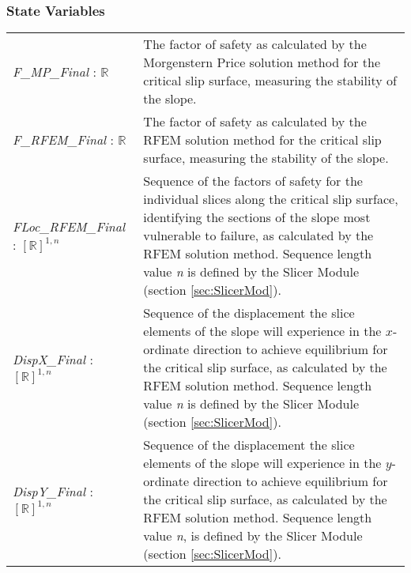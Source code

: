 \documentclass[12pt, titlepage]{article}
\begin{document}
\subsubsection{State Variables}
\renewcommand{\arraystretch}{1.5}
\begin{longtable}{p{} p{}}
  \textit{F\_MP\_Final} : $\mathbb{R}$ & The factor of safety as
  calculated by the Morgenstern Price solution method for the
  critical slip surface, measuring the stability of the slope. \\

  \textit{F\_RFEM\_Final} : $\mathbb{R}$ & The factor of safety as
  calculated by the RFEM solution method for the critical slip
  surface, measuring the stability of the slope. \\

  \textit{FLoc\_RFEM\_Final} : $[\mathbb{R}]^{1,n}$ & Sequence of the
  factors of safety for the individual slices along the critical slip
  surface, identifying the sections of the slope most vulnerable to
  failure, as calculated by the RFEM solution method. Sequence length
  value \textit{n} is defined by the Slicer Module (section
  \ref{sec:SlicerMod}).\\

  \textit{DispX\_Final} : $[\mathbb{R}]^{1,n}$ & Sequence of the
  displacement the slice elements of the slope will experience in the
  $x$-ordinate direction to achieve equilibrium for the critical slip
  surface, as calculated by the RFEM solution method. Sequence length
  value \textit{n} is defined by the Slicer Module (section
  \ref{sec:SlicerMod}).\\

  \textit{DispY\_Final} : $[\mathbb{R}]^{1,n}$ & Sequence of the
  displacement the slice elements of the slope will experience in the
  $y$-ordinate direction to achieve equilibrium for the critical slip
  surface, as calculated by the RFEM solution method. Sequence length
  value \textit{n}, is defined by the Slicer Module (section
  \ref{sec:SlicerMod}). \\
\end{longtable}
\end{document}
